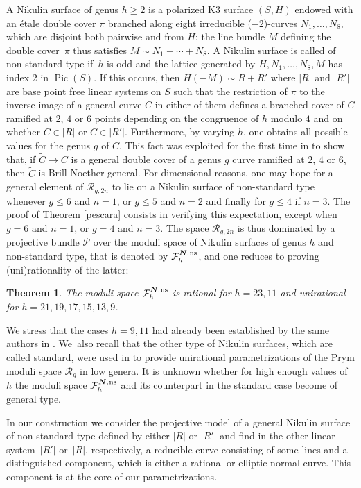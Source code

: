 \documentclass[JEP,XML,SOM,Unicode,NoEqCountersInSection,published]{cedram}
\newcommand{\ns}{{\mkern1mu\mathrm{ns}}}
\newcommand{\bN}{\boldsymbol{N}}
\theoremstyle{plain}
\newtheorem{thm}{Theorem}[section]
\theoremstyle{definition}
\DeclareMathOperator{\Pic}{Pic}
\newcommand\F{{\mathcal F}}
\renewcommand\P{{\mathcal P}}
\newcommand\R{{\mathcal R}}
\begin{document}
A Nikulin surface of genus $h\geq 2$ is a polarized K3 surface $(S,H)$ endowed with an étale double cover $\pi$ branched along eight irreducible ($-2$)-curves $N_1,\ldots,N_8$, which are disjoint both pairwise and from $H$; the line bundle $M$ defining the double cover~$\pi$ thus satisfies $M\sim N_1+\cdots+N_8$. A Nikulin surface is called of non-standard type if~$h$ is odd and the lattice generated by $H,N_1,\ldots,N_8,M$ has index $2$ in $\Pic(S)$. If this occurs, then $H(-M)\sim R+R'$ where $|R|$ and $|R'|$ are base point free linear systems on $S$ \cite{GS} such that the restriction of $\pi$ to the inverse image of a general curve $C$ in either of them defines a branched cover of $C$ ramified at $2$, $4$ or $6$ points depending on the congruence of $h$ modulo $4$ and on whether $C\in |R|$ or $C\in |R'|$. Furthermore, by varying $h$, one obtains all possible values for the genus $g$ of $C$. This fact was exploited for the first time in \cite{DL} to show that, if $\widetilde C\to C$ is a general double cover of a genus $g$ curve ramified at $2$, $4$ or $6$, then $\widetilde C$ is Brill-Noether general.
For dimensional reasons, one may hope for a general element of $\mathcal R_{g,2n}$ to lie on a Nikulin surface of non-standard type whenever $g\leq 6$ and $n=1$, or $g\leq 5$ and $n=2$ and finally for $g\leq 4$ if $n=3$. The proof of Theorem \ref{pescara} consists in verifying this expectation, except when $g=6$ and $n=1$, or $g=4$ and $n=3$. The space $\R_{g,2n}$ is thus dominated by a projective bundle $\P$ over the moduli space of Nikulin surfaces of genus $h$ and non-standard type, that is denoted by $\F_h^{\bN,\ns}$, and one reduces to proving (uni)rationality of the latter:
\begin{thm}\label{moduli}
The moduli space $\F_h^{\bN,\ns}$ is rational for $h=23,11$ and unirational for $h=21,19,17, 15,13,9$.
\end{thm}
We stress that the cases $h=9,11$ had already been established by the same authors in \cite{KLV2}. We~also recall that the other type of Nikulin surfaces, which are called standard, were used in \cite{FV1} to provide unirational parametrizations of the Prym moduli space $\R_g$ in low genera.
It is unknown whether for high enough values of $h$ the moduli space $\F_h^{\bN,\ns}$ and its counterpart in the standard case become of general type.

In our construction we consider the projective model of a general Nikulin surface of non-standard type defined by either $|R|$ or $|R'|$ and find in the other linear system~$|R'|$ or~$|R|$, respectively, a reducible curve consisting of some lines and a distinguished component, which is either a rational or elliptic normal curve. This component is at the core of our parametrizations.
\end{document}
